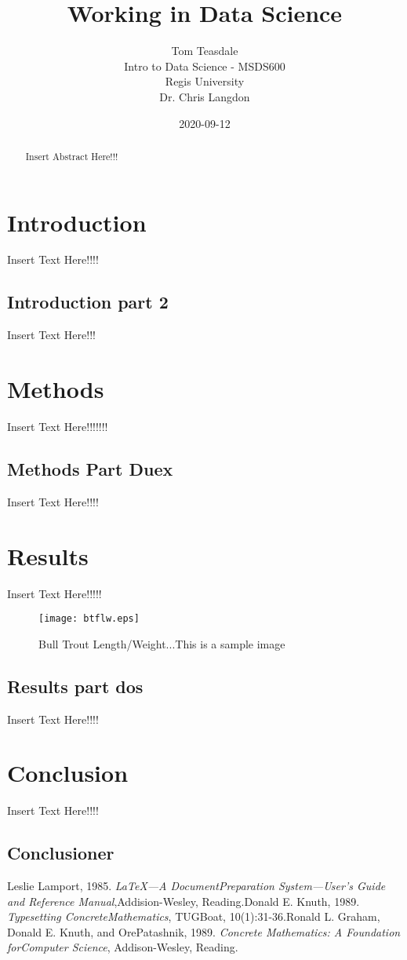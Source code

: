 \documentclass[12pt]{article}
\title{Working in Data Science}
\date{2020-09-12}
\author{Tom Teasdale\\
	Intro to Data Science -  MSDS600\\
	Regis University\\
	Dr. Chris Langdon}
\begin{document}
	\maketitle
\newpage
\tableofcontents
\newpage
\begin{abstract}
Insert Abstract Here!!!
\end{abstract}
\newpage
{}
\section{Introduction}
Insert Text Here!!!!
\subsection{Introduction part 2}
Insert Text Here!!!
\section{Methods}
Insert Text Here!!!!!!!
\subsection{Methods Part Duex}
Insert Text Here!!!!
\section{Results}
Insert Text Here!!!!!
\begin{figure}
\begin{center}
\texttt{[image: btflw.eps]}
\caption{Bull Trout Length/Weight...This is a sample image}
\end{center}
\end{figure}
\subsection{Results part dos}
Insert Text Here!!!!
\section{Conclusion}
Insert Text Here!!!!
\subsection{Conclusioner}
\newpage
\begin{thebibliography}{9}Leslie Lamport, 1985. \emph{\LaTeX---A DocumentPreparation System---User’s Guide and Reference Manual},Addision-Wesley, Reading.Donald E. Knuth, 1989. \emph{Typesetting ConcreteMathematics}, TUGBoat, 10(1):31-36.Ronald L. Graham, Donald E. Knuth, and OrePatashnik, 1989. \emph{Concrete Mathematics: A Foundation forComputer Science}, Addison-Wesley, Reading.\end{thebibliography}
\end{document}
